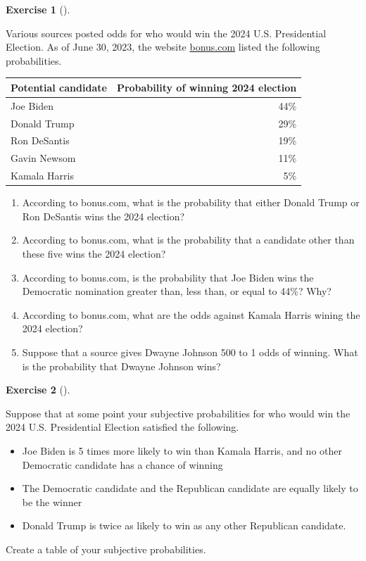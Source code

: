 \documentclass[
  letterpaper,
  DIV=11,
  numbers=noendperiod]{scrreprt}
\providecommand{\tightlist}{%
  \setlength{\itemsep}{0pt}\setlength{\parskip}{0pt}}
\theoremstyle{plain}
\theoremstyle{definition}
\theoremstyle{definition}
\newtheorem{exercise}{Exercise}[chapter]
\theoremstyle{definition}
\theoremstyle{remark}
\begin{document}
\begin{exercise}[]\protect\hypertarget{exr-consistency-election}{}\label{exr-consistency-election}

Various sources posted odds for who would win the 2024 U.S. Presidential
Election. As of June 30, 2023, the website
\href{https://www.bonus.com/election/}{bonus.com} listed the following
probabilities.

\begin{longtable}[]{@{}lr@{}}
\toprule\noalign{}
Potential candidate & Probability of winning 2024 election \\
\midrule\noalign{}
\endhead
\bottomrule\noalign{}
\endlastfoot
Joe Biden & 44\% \\
Donald Trump & 29\% \\
Ron DeSantis & 19\% \\
Gavin Newsom & 11\% \\
Kamala Harris & 5\% \\
\end{longtable}

\begin{enumerate}
\def\labelenumi{\arabic{enumi}.}
\tightlist
\item
  According to bonus.com, what is the probability that either Donald
  Trump or Ron DeSantis wins the 2024 election?
\item
  According to bonus.com, what is the probability that a candidate other
  than these five wins the 2024 election?
\item
  According to bonus.com, is the probability that Joe Biden wins the
  Democratic nomination greater than, less than, or equal to 44\%? Why?
\item
  According to bonus.com, what are the odds against Kamala Harris wining
  the 2024 election?
\item
  Suppose that a source gives Dwayne Johnson 500 to 1 odds of winning.
  What is the probability that Dwayne Johnson wins?
\end{enumerate}

\end{exercise}

\begin{exercise}[]\protect\hypertarget{exr-normalize-election}{}\label{exr-normalize-election}

Suppose that at some point your subjective probabilities for who would
win the 2024 U.S. Presidential Election satisfied the following.

\begin{itemize}
\tightlist
\item
  Joe Biden is 5 times more likely to win than Kamala Harris, and no
  other Democratic candidate has a chance of winning
\item
  The Democratic candidate and the Republican candidate are equally
  likely to be the winner
\item
  Donald Trump is twice as likely to win as any other Republican
  candidate.
\end{itemize}

Create a table of your subjective probabilities.

\end{exercise}
\end{document}
